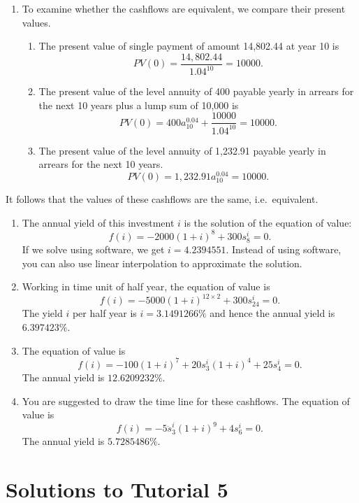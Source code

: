 \documentclass[
]{book}
\theoremstyle{definition}
\theoremstyle{definition}
\theoremstyle{definition}
\theoremstyle{definition}
\theoremstyle{remark}
\begin{document}
\begin{enumerate}
\def\labelenumi{\arabic{enumi}.}
\item
  To examine whether the cashflows are equivalent, we compare their present values.

  \begin{enumerate}
  \def\labelenumii{\alph{enumii}.}
  \item
    The present value of single payment of amount 14,802.44 at year 10 is
    \[ PV(0) =  \frac{14,802.44}{1.04^{10}} = 10000.\]
  \item
    The present value of the level annuity of 400 payable yearly in arrears for the next 10 years plus a lump sum of 10,000 is
    \[ PV(0) =  400 a^{0.04}_{10} +\frac{10000}{1.04^{10}} = 10000.\]
  \item
    The present value of the level annuity of 1,232.91 payable yearly in arrears for the next 10 years.
    \[ PV(0) =  1,232.91 a^{0.04}_{10}  = 10000.\]
  \end{enumerate}
\end{enumerate}

It follows that the values of these cashflows are the same, i.e.~equivalent.

\begin{enumerate}
\def\labelenumi{\arabic{enumi}.}
\setcounter{enumi}{1}
\item
  The annual yield of this investment \(i\) is the solution of the equation of value:
  \[ f(i) = -2000(1+i)^8 +300 s^i_8 = 0. \]
  If we solve using software, we get \(i = 4.2394551%
  \). Instead of using software, you can also use linear interpolation to approximate the solution.
\item
  Working in time unit of half year, the equation of value is
  \[ f(i) = -5000(1+i)^{12 \times 2} + 300 s^i_{24} = 0. \]
  The yield \(i\) per half year is \(i = 3.1491266\%\) and hence the annual yield is \(6.397423\%.\)
\item
  The equation of value is
  \[ f(i) = -100(1+i)^{7} + 20 s^i_{3}(1+i)^{4}  + 25 s^i_{4} = 0. \]
  The annual yield is \(12.6209232\%.\)
\item
  You are suggested to draw the time line for these cashflows. The equation of value is
  \[ f(i) = -5 \ddot{s}^i_{3}(1+i)^{9}   + 4 s^i_{6} = 0. \]
  The annual yield is \(5.7285486\%.\)
\end{enumerate}

\section{Solutions to Tutorial 5}\label{solutions-to-tutorial-5}
\end{document}

